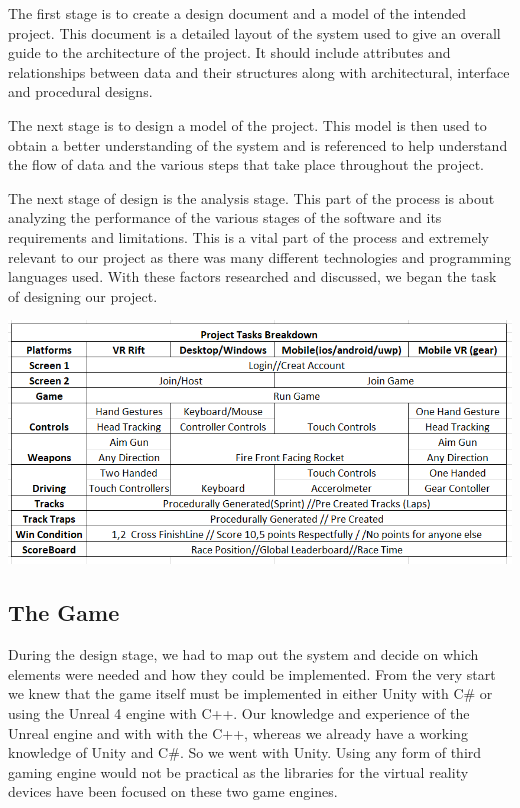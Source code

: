 The first stage is to create a design document and a model of the intended project. This document is a detailed layout of the system used to give an overall guide to the architecture of the project.
It should include attributes and relationships between data and their structures along with architectural, interface and procedural designs.
\newline

The next stage is to design a model of the project. This model is then used to obtain a better understanding of the system and is referenced to help understand the flow of data and the various steps that take place throughout the project. 
\cite {36160220110101}

\newline

The next stage of design is the analysis stage. This part of the process is about analyzing the performance of the various stages of the software and its requirements and limitations. This is a vital part of the process and extremely relevant to our project as there was many different technologies and programming languages used. With these factors researched and discussed, we began the task of designing our project.
\newline

\includegraphics[width=1\columnwidth]{img/breakdown.PNG}

\subsection {The Game}
During the design stage, we had to map out the system and decide on which elements were needed and how they could be implemented. From the very start we knew that the game itself must be implemented in either Unity with C\# or using the Unreal 4 engine with C++. Our knowledge and experience of the Unreal engine and with with the C++, whereas we already have a working knowledge of Unity and C\#. So we went with Unity. Using any form of third gaming engine would not be practical as the libraries for the virtual reality devices have been focused on these two game engines.\newline

